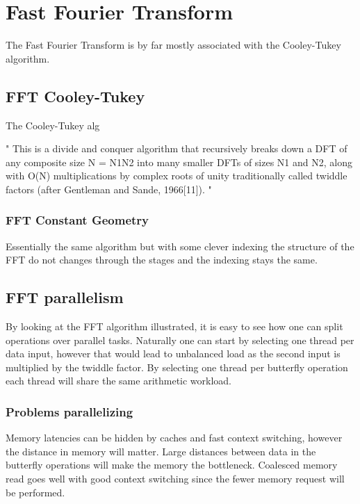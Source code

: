 \section{Fast Fourier Transform}

The Fast Fourier Transform is by far mostly associated with the Cooley-Tukey algorithm.

\subsection{FFT Cooley-Tukey}

The Cooley-Tukey alg

"
This is a divide and conquer algorithm that recursively breaks down a DFT of any composite size N = N1N2 into many smaller DFTs of sizes N1 and N2, along with O(N) multiplications by complex roots of unity traditionally called twiddle factors (after Gentleman and Sande, 1966[11]).
"

\subsubsection{FFT Constant Geometry}

Essentially the same algorithm but with some clever indexing the structure of the FFT do not changes through the stages and the indexing stays the same.

\subsection{FFT parallelism}

By looking at the FFT algorithm illustrated, it is easy to see how one can split operations over parallel tasks. Naturally one can start by selecting one thread per data input, however that would lead to unbalanced load as the second input is multiplied by the twiddle factor. By selecting one thread per butterfly operation each thread will share the same arithmetic workload.

\subsubsection{Problems parallelizing}

Memory latencies can be hidden by caches and fast context switching, however the distance in memory will matter. Large distances between data in the butterfly operations will make the memory the bottleneck. Coalesced memory read goes well with good context switching since the fewer memory request will be performed.